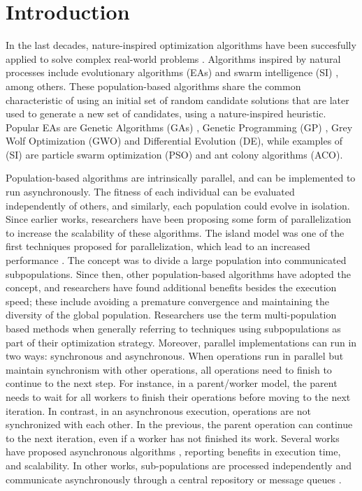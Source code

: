 \documentclass[review]{elsarticle}
\begin{document}
\linenumbers

\section{Introduction}

In the last decades, nature-inspired optimization algorithms have been succesfully
applied to solve complex real-world problems \cite{yang2014nature}. Algorithms
inspired by natural processes include evolutionary algorithms (EAs)
\cite{back1996evolutionary} and swarm intelligence (SI) \cite{kennedy2006swarm},
among others. These population-based algorithms share the common characteristic
of using an initial set of random candidate solutions that are later used to
generate a new set of candidates, using a nature-inspired heuristic. Popular EAs
are Genetic Algorithms (GAs) \cite{holland1992adaptation,eiben2003genetic}, 
Genetic Programming (GP) \cite{back1996evolutionary}, Grey Wolf Optimization
(GWO) and Differential Evolution (DE), while examples of (SI) are particle swarm
optimization (PSO) and ant colony algorithms (ACO).

Population-based algorithms are intrinsically parallel, and can be implemented to run asynchronously. %
The fitness of each individual can be evaluated independently of 
others, and similarly, each population could evolve in isolation. Since 
earlier works, researchers have been proposing some form of parallelization
\cite{muhlenbein1988evolution} to increase the scalability of these algorithms.
The island model was one of the first techniques proposed for parallelization,
which lead to an increased performance \cite{gorges1990explicit,grosso1985computer}. 
The concept was to divide a large population into communicated subpopulations. 
Since then, other population-based algorithms have adopted the concept, 
and researchers have found additional benefits
besides the execution speed; these include avoiding a premature convergence and
maintaining the diversity of the global population. Researchers use the term
multi-population based methods when generally referring to techniques using
subpopulations as part of their optimization strategy. %
Moreover, parallel implementations can run in two ways: synchronous and
asynchronous. When operations run in parallel but maintain synchronism with
other operations,  all operations need to finish to continue to the next step.
For instance, in a  parent/worker model, the parent needs to wait for all
workers to finish their operations before moving to the next iteration.  In
contrast, in an asynchronous execution,  operations are not synchronized with
each other. In the previous, the parent operation can continue to the next
iteration, even if a worker has not finished its work.  Several works have
proposed asynchronous algorithms \cite{coleman89,baugh2003asynchronous}, reporting benefits in execution time, and
scalability. In other works, sub-populations
are processed independently and communicate asynchronously through a central
repository \cite{sofea:cec2012,agajaj} or message queues \cite{salza2019speed, guervos2018introducing} .
\end{document}
